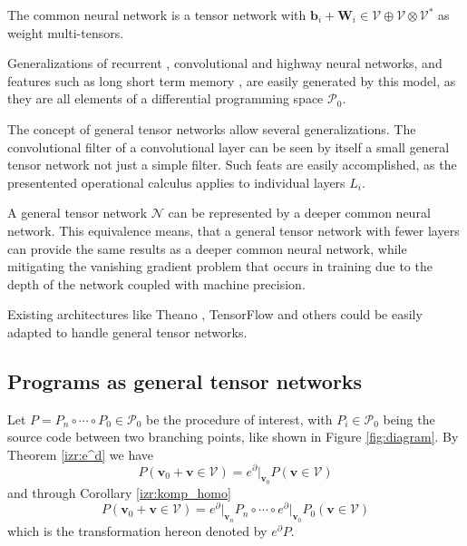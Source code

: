 \documentclass[smallcondensed]{svjour3}
\newcommand{\bfW}{\mathbf{W}}
\newcommand{\VV}{\mathcal{V}}
\newcommand{\NN}{\mathcal{N}}
\newcommand{\vv}{\mathbf{v}}
\newcommand{\dP}{\mathcal{P}}
\newcommand{\D}{\partial}
\begin{document}
\begin{remark}
  The common neural network is a tensor network with $\mathbf{b}_i+\bfW_i\in
  \VV\oplus \VV\otimes \VV^*$ as weight multi-tensors.
\end{remark}

Generalizations of recurrent \cite{RecurrentNet}, convolutional \cite{ConvNet} and highway  \cite{HighwayNet} neural networks, and features such as long short term memory \cite{LSTM}, are easily generated by this model, as they are all elements of a differential programming space $\dP_0$.

The concept of general tensor networks allow several generalizations. The
convolutional filter of a convolutional layer can be seen by itself a small general
tensor network  not just a simple filter. Such feats are easily accomplished, as
the presentented operational calculus applies to individual layers $L_i$.  
 
A general tensor network $\NN$ can be represented by a deeper
common neural network. This equivalence means, that a general tensor network
with fewer layers can provide the same results as a deeper common neural
network, while mitigating the vanishing gradient problem
\cite{VanishingGradient} that occurs in training due to the depth of the network
coupled with machine precision. 

\begin{remark}
Existing architectures like Theano \cite{Theano}, TensorFlow \cite{TensorFlow}
and others could be easily adapted to handle general tensor networks.
\end{remark}

\subsection{Programs as general tensor networks}\label{sec:progAsNet}

Let $P=P_n\circ\cdots\circ P_0\in\dP_0$ be the procedure of interest, with $P_i\in\dP_0$ being the source code between two branching points, like shown in Figure \ref{fig:diagram}.
By Theorem \ref{izr:e^d} we have
\begin{equation}\label{eq:PGN1}
P(\vv_0+\vv\in \VV)=e^\D\vert_{\vv_0} P(\vv\in \VV)
\end{equation}
and through Corollary \ref{izr:komp_homo}
\begin{equation}\label{eq:eDkompo}
P(\vv_0+\vv\in \VV)=e^\D\vert_{\vv_n} P_n\circ\cdots \circ e^\D\vert_{\vv_0} P_0(\vv\in \VV)
\end{equation}
which is the transformation hereon denoted by $e^\D P$.
\end{document}
